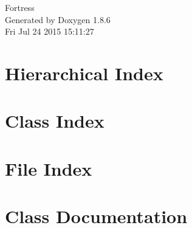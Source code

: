 \documentclass[twoside]{book}
\newcommand{\clearemptydoublepage}{%
  \newpage{\pagestyle{empty}\cleardoublepage}%
}
\begin{document}
\hypersetup{pageanchor=false}
\begin{titlepage}
\vspace*{7cm}
\begin{center}%
{\Large Fortress }\\
\vspace*{1cm}
{\large Generated by Doxygen 1.8.6}\\
\vspace*{0.5cm}
{\small Fri Jul 24 2015 15:11:27}\\
\end{center}
\end{titlepage}
\clearemptydoublepage
\tableofcontents
\clearemptydoublepage
{}
\hypersetup{pageanchor=true}

\chapter{Hierarchical Index}

\chapter{Class Index}

\chapter{File Index}

\chapter{Class Documentation}



































\end{document}
